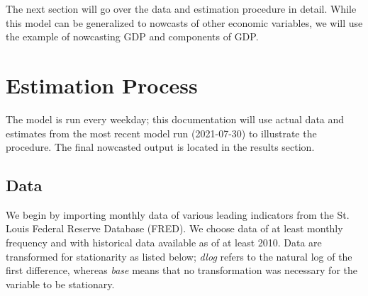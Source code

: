 \documentclass[11pt, letterpaper]{article}\usepackage[]{graphicx}\usepackage[]{color}
\begin{document}
The next section will go over the data and estimation procedure in detail. While this model can be generalized to nowcasts of other economic variables, we will use the example of nowcasting GDP and components of GDP.

\newpage
\section{Estimation Process}
The model is run every weekday; this documentation will use actual data and estimates from the most recent model run (2021-07-30) to illustrate the procedure. The final nowcasted output is located in the results section.

\subsection{Data}
We begin by importing monthly data of various leading indicators from the St. Louis Federal Reserve Database (FRED). We choose data of at least monthly frequency and with historical data available as of at least 2010. Data are transformed for stationarity as listed below; \textit{dlog} refers to the natural log of the first difference, whereas \textit{base} means that no transformation was necessary for the variable to be stationary.
\end{document}
